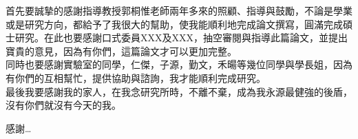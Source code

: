 \begin{acknowledgementszh}
首先要誠摯的感謝指導教授郭桐惟老師兩年多來的照顧、指導與鼓勵，不論是學業或是研究方向，都給予了我很大的幫助，使我能順利地完成論文撰寫，圓滿完成碩士研究。在此也要感謝口式委員XXX及XXX，抽空審閱與指導此篇論文，並提出寶貴的意見，因為有你們，這篇論文才可以更加完整。\\

同時也要感謝實驗室的同學，仁傑，子源，勤文，禾暘等幾位同學與學長姐，因為有你們的互相幫忙，提供協助與諮詢，我才能順利完成研究。\\

最後我要感謝我的家人，在我念研究所時，不離不棄，成為我永源最健強的後盾，沒有你們就沒有今天的我。

感謝\ldots
\end{acknowledgementszh}



